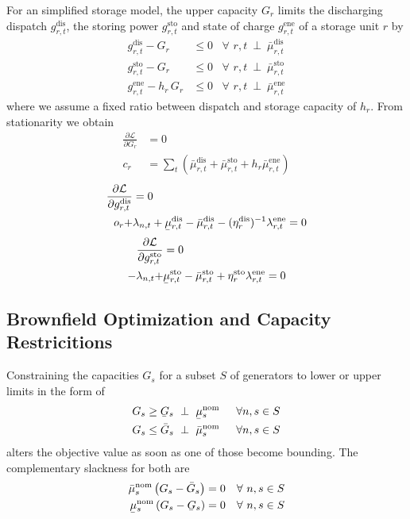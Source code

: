 \documentclass[11pt,twocolumn]{article}
\newcommand{\ubar}[1]{\underaccent{\bar}{#1}}
\newcommand{\hpad}{\hspace{15pt}}
\newcommand{\resultsin}[1]{\hspace{6pt} \bot  \hspace{6pt} #1}
\newcommand{\Forall}[1]{\hspace{10pt} \forall \,\, #1 }
\newcommand{\pdv}[2]{\frac{\partial #1}{\partial #2}}
\newcommand{\capacitygeneration}{G_{s}}
\newcommand{\capacitygenerationupper}{\bar{G}_{s}}
\newcommand{\capacitygenerationlower}{\ubar{G}_{s}}
\newcommand{\muuppergenerationnom}{\bar{\mu}^\text{nom}_{s}}
\newcommand{\mulowergenerationnom}{\ubar{\mu}^\text{nom}_{s}}
\newcommand{\storage}{g_{r,t}}
\newcommand{\storagedispatch}{\storage^\text{dis}}
\newcommand{\storagecharge}{\storage^\text{sto}}
\newcommand{\storagesoc}{\storage^\text{ene}}
\newcommand{\efficiency}{\eta_{r}}
\newcommand{\efficiencydispatch}{\efficiency^\text{dis}}
\newcommand{\efficiencycharge}{\efficiency^\text{sto}}
\newcommand{\operationalpricestorage}{o_r}
\newcommand{\capitalpricestorage}{c_r}
\newcommand{\capacitystorage}{G_r}
\newcommand{\mulowerstoragedispatch}{\ubar{\mu}_{r,t}^\text{dis}}
\newcommand{\muupperstoragedispatch}{\bar{\mu}_{r,t}^\text{dis}}
\newcommand{\mulowerstoragecharge}{\ubar{\mu}_{r,t}^\text{sto}}
\newcommand{\muupperstoragecharge}{\bar{\mu}_{r,t}^\text{sto}}
\newcommand{\muupperstoragesoc}{\bar{\mu}_{r,t}^\text{ene}}
\newcommand{\mustateofcharge}{\lambda^\text{ene}_{r,t}}
\newcommand{\lagrangian}{\mathcal{L}}
\newcommand{\lmp}[1][n]{\lambda_{#1,t}}
\begin{document}
For an simplified storage model, the upper capacity $\capacitystorage$ limits the discharging dispatch $\storagedispatch$, the storing power $\storagecharge$ and state of charge $\storagesoc$ of a storage unit $r$ by 
\begin{align}
    \storagedispatch - \capacitystorage &\le 0 \Forall{r,t} \resultsin{\muupperstoragedispatch} \\
    \storagecharge - \capacitystorage &\le 0 \Forall{r,t} \resultsin{\muupperstoragecharge} \\
    \storagesoc - h_r \, \capacitystorage &\le 0 \Forall{r,t} \resultsin{\muupperstoragesoc}
\end{align}
where we assume a fixed ratio between dispatch and storage capacity of $h_r$. 
From stationarity we obtain 
\begin{align}
    \pdv{\lagrangian}{\capacitystorage} &= 0 \\
    \capitalpricestorage &= \sum_t \left( \muupperstoragedispatch + \muupperstoragecharge + h_r \muupperstoragesoc  \right)
\end{align}
\begin{align}
    \pdv{\lagrangian}{\storagedispatch} &= 0 \\
    \operationalpricestorage +& \lmp + \mulowerstoragedispatch - \muupperstoragedispatch - (\efficiencydispatch )^{-1} \mustateofcharge = 0  
    \label{eq:lagrangian_storage_dispatch}
\end{align}
\begin{align}
    \pdv{\lagrangian}{\storagecharge} &= 0 \\
    - \lmp +& \mulowerstoragecharge - \muupperstoragecharge + \efficiencycharge \mustateofcharge = 0 
    \label{eq:lagrangian_storage_charge}
\end{align}


\subsection{Brownfield Optimization and Capacity Restricitions}

Constraining the capacities $\capacitygeneration$  for a subset $S$ of generators to lower or upper limits in the form of
\begin{align}
\capacitygeneration \ge \capacitygenerationlower \resultsin{\mulowergenerationnom} \hpad \forall{n,s \in S} \label{eq:capacityexpansionminimum}\\
\capacitygeneration \le \capacitygenerationupper \resultsin{\muuppergenerationnom} \hpad \forall{n,s \in S}
\label{eq:capacityexpansionmaximum}
\end{align}
alters the objective value as soon as one of those become bounding. 
The complementary slackness for both are 
\begin{align}
    \muuppergenerationnom \left( \capacitygeneration - \capacitygenerationupper \right) =0 \Forall{n,s \in S} \\
    \mulowergenerationnom \left( \capacitygeneration - \capacitygenerationlower \right) =0 \Forall{n,s \in S}
\end{align}
\end{document}
